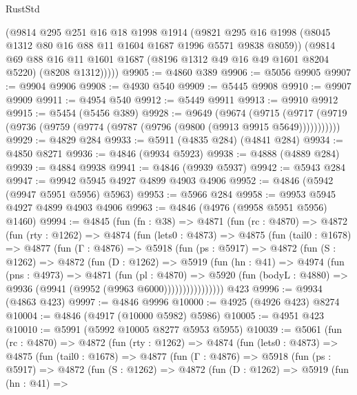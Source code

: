\begin{lexlean}{RustStd}
\begin{coremodule}
        (@9814
          @295
          @251
          @16
          @18
          @1998
          @1914
          (@9821 @295 @16 @1998 (@8045 @1312 @80 @16 @88 @11 @1604 @1687 @1996 @5571 @9838 @8059))
          (@9814
            @69
            @88
            @16
            @11
            @1601
            @1687
            (@8196 @1312 @49 @16 @49 @1601 @8204 @5220)
            (@8208 @1312)))))
@9905 := @4860 @389
@9906 := @5056 @9905
@9907 := @9904 @9906
@9908 := @4930 @540
@9909 := @5445 @9908
@9910 := @9907 @9909
@9911 := @4954 @540
@9912 := @5449 @9911
@9913 := @9910 @9912
@9915 := @5454 (@5456 @389)
@9928 := @9649
    (@9674
      (@9715 (@9717 (@9719 (@9736 (@9759 (@9774 (@9787 (@9796 (@9800 (@9913 @9915 @5649)))))))))))
@9929 := @4829 @284
@9933 := @5911 (@4835 @284) (@4841 @284)
@9934 := @4850 @8271
@9936 := @4846 (@9934 @5923)
@9938 := @4888 (@4889 @284)
@9939 := @4884 @9938
@9941 := @4846 (@9939 @5937)
@9942 := @5943 @284
@9947 := @9942 @5945 @4927 @4899 @4903 @4906
@9952 := @4846 (@5942 (@9947 @5951 @5956) @5963)
@9953 := @5966 @284
@9958 := @9953 @5945 @4927 @4899 @4903 @4906
@9963 := @4846 (@4976 (@9958 @5951 @5956) @1460)
@9994 := @4845
    (fun (fn : @38) =>
    @4871
      (fun (rc : @4870) =>
      @4872
        (fun (rty : @1262) =>
        @4874
          (fun (lets0 : @4873) =>
          @4875
            (fun (tail0 : @1678) =>
            @4877
              (fun (Γ : @4876) =>
              @5918
                (fun (ps : @5917) =>
                @4872
                  (fun (S : @1262) =>
                  @4872
                    (fun (D : @1262) =>
                    @5919
                      (fun (hn : @41) =>
                      @4974
                        (fun (pns : @4973) =>
                        @4871
                          (fun (pl : @4870) =>
                          @5920
                            (fun (bodyL : @4880) => @9936 (@9941 (@9952 (@9963 @6000))))))))))))))))
    @423
@9996 := @9934 (@4863 @423)
@9997 := @4846 @9996
@10000 := @4925 (@4926 @423) @8274
@10004 := @4846 (@4917 (@10000 @5982) @5986)
@10005 := @4951 @423
@10010 := @5991 (@5992 @10005 @8277 @5953 @5955)
@10039 := @5061
    (fun (rc : @4870) =>
    @4872
      (fun (rty : @1262) =>
      @4874
        (fun (lets0 : @4873) =>
        @4875
          (fun (tail0 : @1678) =>
          @4877
            (fun (Γ : @4876) =>
            @5918
              (fun (ps : @5917) =>
              @4872
                (fun (S : @1262) =>
                @4872
                  (fun (D : @1262) =>
                  @5919
                    (fun (hn : @41) =>

\end{coremodule}
\end{lexlean}

